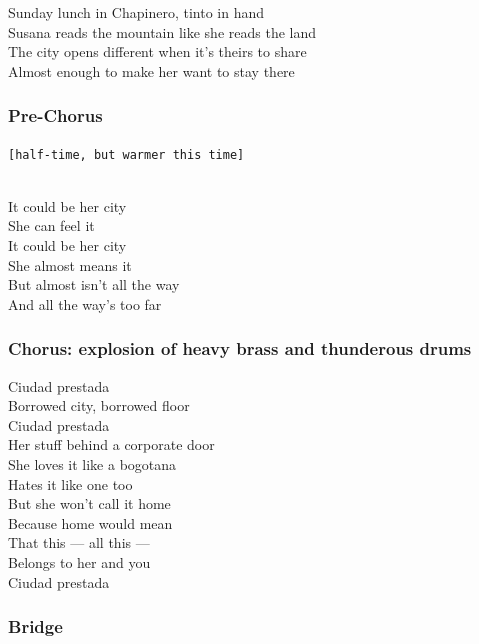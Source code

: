 Sunday lunch in Chapinero, tinto in hand\\
Susana reads the mountain like she reads the land\\
The city opens different when it's theirs to share\\
Almost enough to make her want to stay there

\subsubsection{Pre-Chorus}\label{pre-chorus-61}

\texttt{{[}half-time,\ but\ warmer\ this\ time{]}}\strut \\
It could be her city\\
She can feel it\\
It could be her city\\
She almost means it\\
But almost isn't all the way\\
And all the way's too far

\subsubsection{Chorus: explosion of heavy brass and thunderous
drums}\label{chorus-explosion-of-heavy-brass-and-thunderous-drums-1}

Ciudad prestada\\
Borrowed city, borrowed floor\\
Ciudad prestada\\
Her stuff behind a corporate door\\
She loves it like a bogotana\\
Hates it like one too\\
But she won't call it home\\
Because home would mean\\
That this --- all this ---\\
Belongs to her and you\\
Ciudad prestada

\subsubsection{Bridge}\label{bridge-25}

